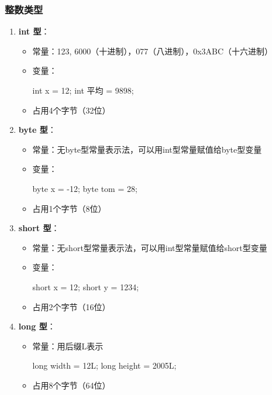 \documentclass[a4paper, 10pt]{ctexart}
\begin{document}
\subsubsection{整数类型}
\begin{enumerate}
  \item \textbf{int 型}：
  \begin{itemize}
    \item 常量：123, 6000（十进制），077（八进制），0x3ABC（十六进制）
    \item 变量：
    \begin{codeblock}
int x = 12;
int 平均 = 9898;
    \end{codeblock}
    \item 占用4个字节（32位）
  \end{itemize}
  \item \textbf{byte 型}：
  \begin{itemize}
    \item 常量：无byte型常量表示法，可以用int型常量赋值给byte型变量
    \item 变量：
    \begin{codeblock}
byte x = -12;
byte tom = 28;
    \end{codeblock}
    \item 占用1个字节（8位）
  \end{itemize}
  \item \textbf{short 型}：
  \begin{itemize}
    \item 常量：无short型常量表示法，可以用int型常量赋值给short型变量
    \item 变量：
    \begin{codeblock}
short x = 12;
short y = 1234;
    \end{codeblock}
    \item 占用2个字节（16位）
  \end{itemize}
  \item \textbf{long 型}：
  \begin{itemize}
    \item 常量：用后缀L表示
    \begin{codeblock}
long width = 12L;
long height = 2005L;
    \end{codeblock}
    \item 占用8个字节（64位）
  \end{itemize}
\end{enumerate}
\end{document}
